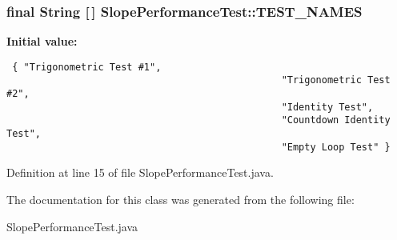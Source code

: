 \subsubsection{\setlength{\rightskip}{0pt plus 5cm}final String [$\,$] {\bf Slope\-Performance\-Test::TEST\_\-NAMES}\hspace{0.3cm}{\tt  [static]}}\label{classSlopePerformanceTest_74e9468c64bbe0e5c614736540fbb0dc}


{\bf Initial value:}

\footnotesize\begin{verbatim} { "Trigonometric Test #1",
                                                "Trigonometric Test #2",
                                                "Identity Test",
                                                "Countdown Identity Test",
                                                "Empty Loop Test" }
\end{verbatim}\normalsize 


Definition at line 15 of file Slope\-Performance\-Test.java.

The documentation for this class was generated from the following file:\begin{CompactItemize}
\item 
Slope\-Performance\-Test.java\end{CompactItemize}
